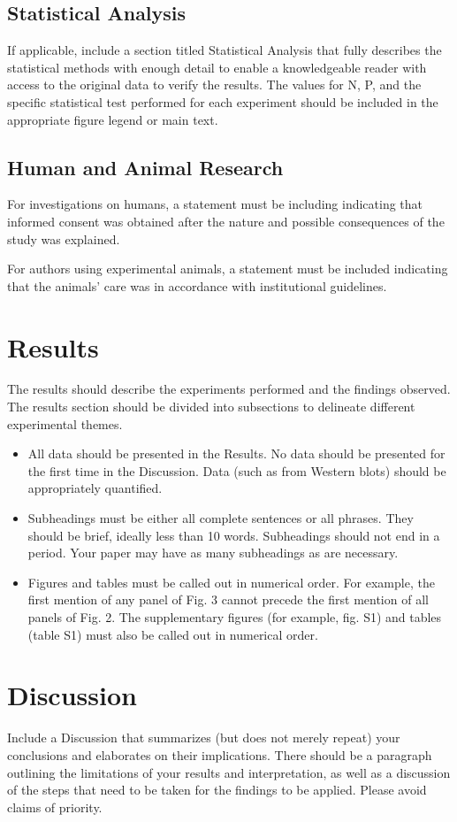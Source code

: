 \documentclass{article}
\begin{document}
\subsection{Statistical Analysis}
If applicable, include a section titled Statistical Analysis that fully describes the statistical methods with enough detail to enable a knowledgeable reader with access to the original data to verify the results. The values for N, P, and the specific statistical test performed for each experiment should be included in the appropriate figure legend or main text. 

\subsection{Human and Animal Research}
For investigations on humans, a statement must be including indicating that informed consent was obtained after the nature and possible consequences of the study was explained.

For authors using experimental animals, a statement must be included indicating that the animals’ care was in accordance with institutional guidelines.

\section{Results}
The results should describe the experiments performed and the findings observed. The results section should be divided into subsections to delineate different experimental themes. 
\begin{itemize}
    \item All data should be presented in the Results. No data should be presented for the first time in the Discussion. Data (such as from Western blots) should be appropriately quantified.
    \item Subheadings must be either all complete sentences or all phrases. They should be brief, ideally less than 10 words. Subheadings should not end in a period. Your paper may have as many subheadings as are necessary.
    \item Figures and tables must be called out in numerical order. For example, the first mention of any panel of Fig. 3 cannot precede the first mention of all panels of Fig. 2. The supplementary figures (for example, fig. S1) and tables (table S1) must also be called out in numerical order. 
\end{itemize}

\section{Discussion}
Include a Discussion that summarizes (but does not merely repeat) your conclusions and elaborates on their implications. There should be a paragraph outlining the limitations of your results and interpretation, as well as a discussion of the steps that need to be taken for the findings to be applied. Please avoid claims of priority. 
\end{document}
